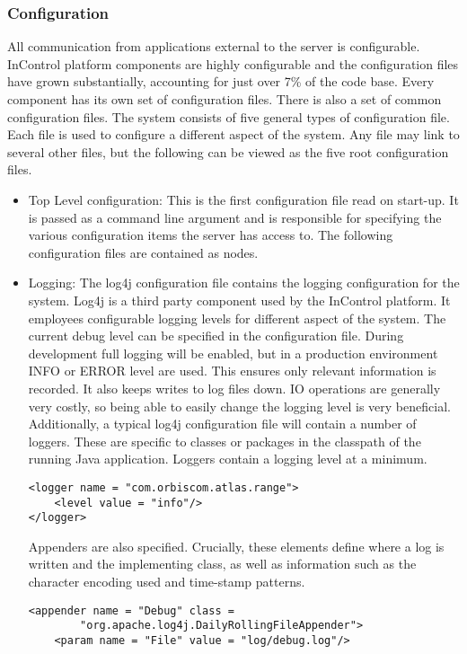 \documentclass[a4paper, 11pt, titlepage]{article}
\begin{document}
\subsubsection{Configuration} 
All communication from applications external to the server is configurable. InControl platform components are highly configurable and the configuration files have grown substantially, accounting for just over 7\% of the code base. Every component has its own set of configuration files. There is also a set of common configuration files. The system consists of five general types of configuration file. Each file is used to configure a different aspect of the system. Any file may link to several other files, but the following can be viewed as the five root configuration files. 
\begin{itemize} 
\label{toplevel}
\item Top Level configuration: This is the first configuration file read on start-up. It is passed as a command line argument and is responsible for specifying the various configuration items the server has access to. The following configuration files are contained as nodes. 
\item Logging: The log4j configuration file contains the logging configuration for the system. Log4j is a third party component used by the InControl platform. It employees configurable logging levels for different aspect of the system. The current debug level can be specified in the configuration file. During development full logging will be enabled, but in a production environment INFO or ERROR level are used. This ensures only relevant information is recorded. It also keeps writes to log files down. IO operations are generally very costly, so being able to easily change the logging level is very beneficial.  Additionally, a typical log4j configuration file will contain a number of loggers. These are specific to classes or packages in the classpath of the running Java application. Loggers contain a logging level at a minimum. 
\begin{verbatim} 
<logger name = "com.orbiscom.atlas.range"> 
    <level value = "info"/> 
</logger> 
\end{verbatim} 
Appenders are also specified. Crucially, these elements define where a log is written and the implementing class, as well as information such as the character encoding used and time-stamp patterns. 
\begin{verbatim} 
<appender name = "Debug" class = 
        "org.apache.log4j.DailyRollingFileAppender"> 
    <param name = "File" value = "log/debug.log"/> 

\end{verbatim}
\end{itemize}
\end{document}
